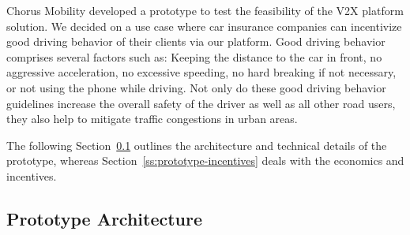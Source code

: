 \documentclass{llncs}
\begin{document}
{		Chorus Mobility developed a prototype to test the feasibility of the V2X platform solution. We decided on a use case where car insurance companies can incentivize good driving behavior of their clients via our platform. Good driving behavior comprises several factors such as: Keeping the distance to the car in front, no aggressive acceleration, no excessive speeding, no hard breaking if not necessary, or not using the phone while driving. Not only do these good driving behavior guidelines increase the overall safety of the driver as well as all other road users, they also help to mitigate traffic congestions in urban areas.
		
		The following Section~\ref{ss:protoype-architecture} outlines the architecture and technical details of the prototype, whereas Section~\ref{ss:prototype-incentives} deals with the economics and incentives.
		
%		
%		
%		
%		

%		
%		
		
		\subsection{Prototype Architecture}
			\label{ss:protoype-architecture}				

}
\end{document}

